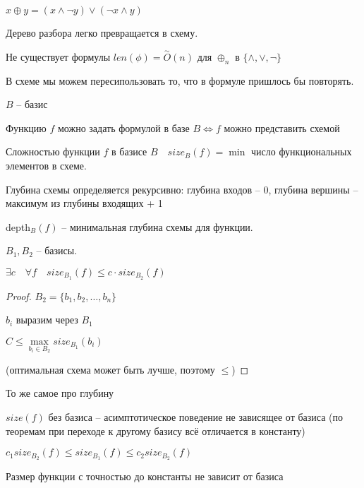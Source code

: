 \documentclass{book}
\theoremstyle{definition}
\begin{document}
$x\oplus y = (x\land \neg y) \lor (\neg x \land y)$

Дерево разбора легко превращается в схему.
\begin{theorem}
    Не существует формулы $len(\phi) = \overset{\sim }O(n)$ для $\oplus_n$ в $\{\land, \lor, \neg\}$
\end{theorem}
В схеме мы можем пересипользовать то, что в формуле пришлось бы повторять.

$B$ -- базис

 \begin{theorem}
     Функцию $f$ можно задать формулой в базе $B \iff  f$ можно представить схемой 
 \end{theorem}

 \begin{definition}
     Сложностью функции $f$ в базисе $B\quad size_B(f) = \min$ число функциональных элементов в схеме.
 \end{definition}
 \begin{definition}
     Глубина схемы определяется рекурсивно: глубина входов -- 0, глубина вершины -- максимум из глубины входящих + 1

     depth$_B(f)$ -- минимальная глубина схемы для функции.
 \end{definition}

 \begin{theorem}
        $B_1, B_2$ -- базисы.

        $\exists c\quad\forall f\quad size_{B_1}(f) \leqslant c\cdot size_{B_2}(f)$
 \end{theorem}
 \begin{proof}
     $B_2 = \{b_1, b_2, \ldots, b_n\}$

     $b_i$ выразим через $B_1$

     $C\leqslant \max\limits_{b_i\in B_2} size_{B_1}(b_i)$

     (оптимальная схема может быть лучше, поэтому $\leqslant $)
 \end{proof}
 \begin{theorem}
     То же самое про глубину
 \end{theorem}
\begin{corollary}
    $size(f)$ без базиса -- асимптотическое поведение не зависящее от базиса (по теоремам при переходе к другому базису всё отличается в константу) 
\end{corollary}
\begin{corollary}
    $c_1 size_{B_2}(f) \leqslant size_{B_1}(f) \leqslant  c_2 size_{B_2}(f)$

    Размер функции с точностью до константы не зависит от базиса
\end{corollary}
\end{document}
